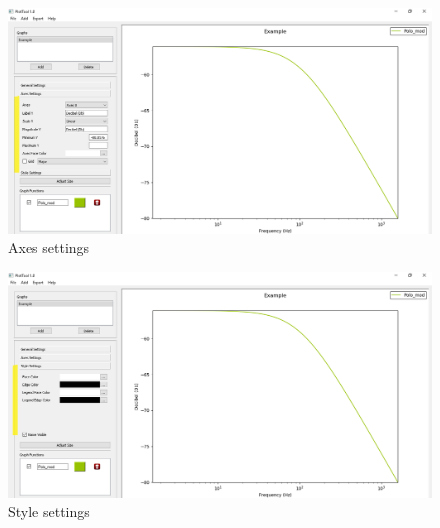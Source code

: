 \documentclass[a4paper,10pt]{article}
\begin{document}
\begin{figure}[H]
\begin{center}
	\includegraphics[scale=0.5]{resources/visor_axes.png}
	\caption{Axes settings}
\end{center}
\end{figure}

\begin{figure}[H]
\begin{center}
	\includegraphics[scale=0.5]{resources/visor_style.png}
	\caption{Style settings}
\end{center}
\end{figure}
\end{document}
